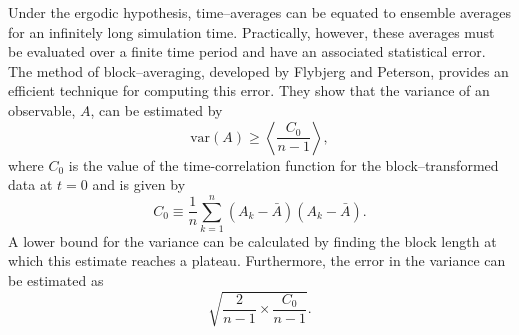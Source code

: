 Under the ergodic hypothesis, time--averages can be equated to ensemble averages for an infinitely long simulation time.\cite{Bopp2008}
Practically, however, these averages must be evaluated over a finite time period and have an associated statistical error.
The method of block--averaging, developed by Flybjerg and Peterson, provides an efficient technique for computing this error.\cite{Flyvbjerg1989}
They show that the variance of an observable, $A$, can be estimated by
\begin{equation}
\mathrm{var}(A) \geq \left< \frac{C_{0}}{n-1} \right>,
\end{equation}
where $C_{0}$ is the value of the time-correlation function for the block--transformed data at $t=0$ and is given by
\begin{equation}
C_{0} \equiv \frac{1}{n} \sum_{k=1}^{n} \left( A_{k} - \bar{A} \right) \left(A_{k} - \bar{A} \right).
\end{equation}
A lower bound for the variance can be calculated by finding the block length at which this estimate reaches a plateau.
Furthermore, the error in the variance can be estimated as 
\begin{equation}
\sqrt{\frac{2}{n-1} \times \frac{C_{0}}{n-1}}.
\end{equation}


